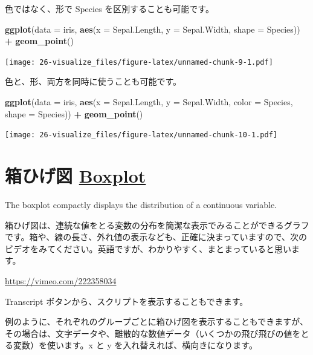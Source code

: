 \documentclass[
  xelatex, ja=standard]{bxjsbook}
\newenvironment{Shaded}{\begin{snugshade}}{\end{snugshade}}
\newcommand{\AttributeTok}[1]{\textcolor[rgb]{0.13,0.29,0.53}{#1}}
\newcommand{\FunctionTok}[1]{\textcolor[rgb]{0.13,0.29,0.53}{\textbf{#1}}}
\newcommand{\NormalTok}[1]{#1}
\newcommand{\SpecialCharTok}[1]{\textcolor[rgb]{0.81,0.36,0.00}{\textbf{#1}}}
\theoremstyle{definition}
\theoremstyle{definition}
\theoremstyle{definition}
\theoremstyle{definition}
\theoremstyle{remark}
\begin{document}
色ではなく、形で Species を区別することも可能です。

\begin{Shaded}
\begin{Highlighting}[]
\FunctionTok{ggplot}\NormalTok{(}\AttributeTok{data =}\NormalTok{ iris, }\FunctionTok{aes}\NormalTok{(}\AttributeTok{x =}\NormalTok{ Sepal.Length, }\AttributeTok{y =}\NormalTok{ Sepal.Width, }\AttributeTok{shape =}\NormalTok{ Species)) }\SpecialCharTok{+}
  \FunctionTok{geom\_point}\NormalTok{()}
\end{Highlighting}
\end{Shaded}

\texttt{[image: 26-visualize\_files/figure-latex/unnamed-chunk-9-1.pdf]}

色と、形、両方を同時に使うことも可能です。

\begin{Shaded}
\begin{Highlighting}[]
\FunctionTok{ggplot}\NormalTok{(}\AttributeTok{data =}\NormalTok{ iris, }\FunctionTok{aes}\NormalTok{(}\AttributeTok{x =}\NormalTok{ Sepal.Length, }\AttributeTok{y =}\NormalTok{ Sepal.Width, }\AttributeTok{color =}\NormalTok{ Species, }\AttributeTok{shape =}\NormalTok{ Species)) }\SpecialCharTok{+}
  \FunctionTok{geom\_point}\NormalTok{()}
\end{Highlighting}
\end{Shaded}

\texttt{[image: 26-visualize\_files/figure-latex/unnamed-chunk-10-1.pdf]}

\hypertarget{ux7bb1ux3072ux3052ux56f3-boxplot}{%
\section{\texorpdfstring{箱ひげ図 \href{https://ggplot2.tidyverse.org/reference/geom_boxplot.html}{Boxplot}}{箱ひげ図 Boxplot}}\label{ux7bb1ux3072ux3052ux56f3-boxplot}}

The boxplot compactly displays the distribution of a continuous variable.

箱ひげ図は、連続な値をとる変数の分布を簡潔な表示でみることができるグラフです。箱や、線の長さ、外れ値の表示なども、正確に決まっていますので、次のビデオをみてください。英語ですが、わかりやすく、まとまっていると思います。

\url{https://vimeo.com/222358034}

Transcript ボタンから、スクリプトを表示することもできます。

例のように、それぞれのグループごとに箱ひげ図を表示することもできますが、その場合は、文字データや、離散的な数値データ（いくつかの飛び飛びの値をとる変数）を使います。x と y を入れ替えれば、横向きになります。
\end{document}
